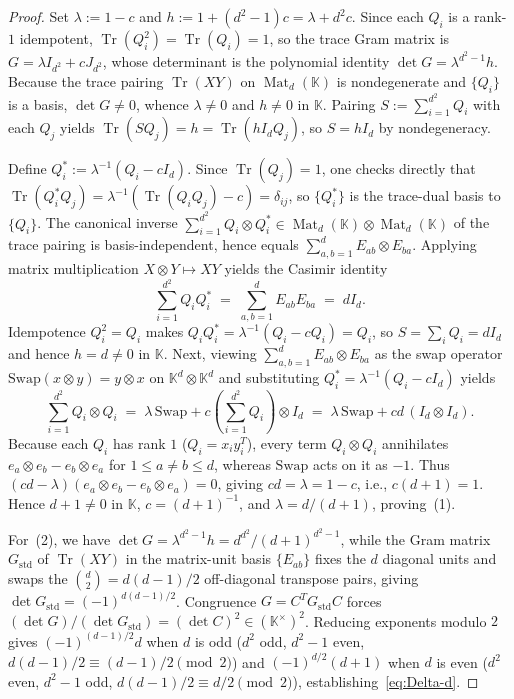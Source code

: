 \documentclass[11pt,reqno]{amsart}
\theoremstyle{definition}
\theoremstyle{remark}
\numberwithin{equation}{section}
\newcommand{\KK}{\mathbb{K}}
\DeclareMathOperator{\Mat}{Mat}
\DeclareMathOperator{\Tr}{Tr}
\begin{document}
\begin{proof}
Set $\lambda := 1 - c$ and $h := 1 + (d^2 - 1)c = \lambda + d^2 c$. Since each $Q_i$ is a rank-$1$ idempotent, $\Tr(Q_i^2) = \Tr(Q_i) = 1$, so the trace Gram matrix is $G = \lambda I_{d^2} + c J_{d^2}$, whose determinant is the polynomial identity $\det G = \lambda^{d^2 - 1} h$. Because the trace pairing $\Tr(XY)$ on $\Mat_d(\KK)$ is nondegenerate and $\{Q_i\}$ is a basis, $\det G \neq 0$, whence $\lambda \neq 0$ and $h \neq 0$ in $\KK$. Pairing $S := \sum_{i=1}^{d^2} Q_i$ with each $Q_j$ yields $\Tr(S Q_j) = h = \Tr(h I_d Q_j)$, so $S = h I_d$ by nondegeneracy.

Define $Q_i^* := \lambda^{-1}(Q_i - c I_d)$. Since $\Tr(Q_j) = 1$, one checks directly that $\Tr(Q_i^* Q_j) = \lambda^{-1}(\Tr(Q_i Q_j) - c) = \delta_{ij}$, so $\{Q_i^*\}$ is the trace-dual basis to $\{Q_i\}$. The canonical inverse $\sum_{i=1}^{d^2} Q_i \otimes Q_i^* \in \Mat_d(\KK) \otimes \Mat_d(\KK)$ of the trace pairing is basis-independent, hence equals $\sum_{a,b=1}^d E_{ab} \otimes E_{ba}$. Applying matrix multiplication $X \otimes Y \mapsto X Y$ yields the Casimir identity
\[
  \sum_{i=1}^{d^2} Q_i Q_i^* \;=\; \sum_{a,b=1}^d E_{ab} E_{ba} \;=\; d I_d.
\]
Idempotence $Q_i^2 = Q_i$ makes $Q_i Q_i^* = \lambda^{-1}(Q_i - c Q_i) = Q_i$, so $S = \sum_i Q_i = d I_d$ and hence $h = d \neq 0$ in $\KK$. Next, viewing $\sum_{a,b=1}^d E_{ab} \otimes E_{ba}$ as the swap operator $\mathrm{Swap}(x \otimes y) = y \otimes x$ on $\KK^d \otimes \KK^d$ and substituting $Q_i^* = \lambda^{-1}(Q_i - c I_d)$ yields
\[
  \sum_{i=1}^{d^2} Q_i \otimes Q_i \;=\; \lambda\,\mathrm{Swap} + c\left(\sum_{i=1}^{d^2} Q_i\right) \otimes I_d \;=\; \lambda\,\mathrm{Swap} + c d\,(I_d \otimes I_d).
\]
Because each $Q_i$ has rank $1$ ($Q_i = x_i y_i^T$), every term $Q_i \otimes Q_i$ annihilates $e_a \otimes e_b - e_b \otimes e_a$ for $1 \le a \neq b \le d$, whereas $\mathrm{Swap}$ acts on it as $-1$. Thus $(c d - \lambda)(e_a \otimes e_b - e_b \otimes e_a) = 0$, giving $c d = \lambda = 1 - c$, i.e., $c(d + 1) = 1$. Hence $d + 1 \neq 0$ in $\KK$, $c = (d + 1)^{-1}$, and $\lambda = d/(d + 1)$, proving~\textup{(1)}.

For~\textup{(2)}, we have $\det G = \lambda^{d^2 - 1} h = d^{d^2}/(d + 1)^{d^2 - 1}$, while the Gram matrix $G_{\mathrm{std}}$ of $\Tr(XY)$ in the matrix-unit basis $\{E_{ab}\}$ fixes the $d$ diagonal units and swaps the $\binom{d}{2} = d(d-1)/2$ off-diagonal transpose pairs, giving $\det G_{\mathrm{std}} = (-1)^{d(d-1)/2}$. Congruence $G = C^T G_{\mathrm{std}} C$ forces $(\det G)/(\det G_{\mathrm{std}}) = (\det C)^2 \in (\KK^\times)^2$. Reducing exponents modulo $2$ gives $(-1)^{(d-1)/2} d$ when $d$ is odd ($d^2$ odd, $d^2 - 1$ even, $d(d-1)/2 \equiv (d-1)/2 \pmod 2$) and $(-1)^{d/2}(d + 1)$ when $d$ is even ($d^2$ even, $d^2 - 1$ odd, $d(d-1)/2 \equiv d/2 \pmod 2$), establishing~\eqref{eq:Delta-d}.


\end{proof}
\end{document}
